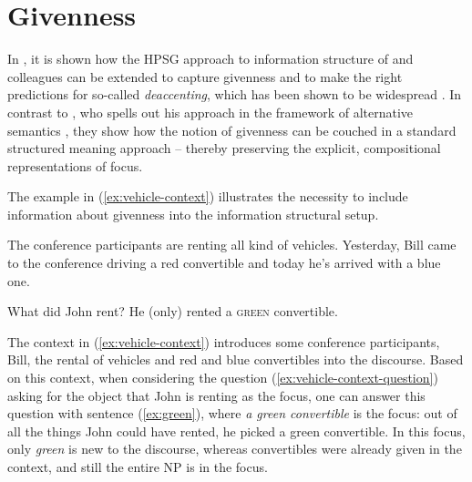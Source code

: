 \documentclass[output=paper
                ,modfonts
                ,nonflat
	        ,collection
	        ,collectionchapter
	        ,collectiontoclongg
 	        ,biblatex
                ,babelshorthands
                ,newtxmath
                ,draftmode
                ,colorlinks, citecolor=brown
]{./langsci/langscibook}
\begin{document}
\section{Givenness}
\label{sec:givenness}

In \cite{DeKuthy.Meurers-11}, it is shown how
the HPSG approach to information structure of \cite{deKuthy2002a} and
colleagues can be extended to capture givenness and to make the right
predictions for so-called \emph{deaccenting}, which has been shown to be
widespread \citep{buering:06}.  In contrast to
\cite{Schwarzschild99a-u}, who spells out his approach in the framework
of alternative semantics \citep{Rooth92a-u}, they show how the notion of
givenness can be couched in a standard structured meaning approach --
thereby preserving the explicit, compositional representations of focus.

The example in (\ref{ex:vehicle-context}) illustrates the necessity
to include information about givenness into the information structural
setup.

\begin{exe}
  \ex\label{ex:vehicle-context} The conference participants are
  renting all kind of vehicles.  Yesterday, Bill came to the
  conference driving a red convertible and today he's arrived with a
  blue one. \begin{xlist} \ex\label{ex:vehicle-context-question} What did John rent?
    \ex\label{ex:green} He (only) rented {\LF}a \textsc{green}
    convertible{\RF}.
  \end{xlist}
\end{exe}


The context in (\ref{ex:vehicle-context}) introduces some conference participants, Bill, the rental of
vehicles and red and blue convertibles into the discourse.  Based on
this context, when considering the question
(\ref{ex:vehicle-context-question}) asking for the object that John is
renting as the focus, one can  answer this question with sentence (\ref{ex:green}), where
\textit{a green convertible} is the focus: out of all the things John
could have rented, he picked a green convertible. In this focus, only
\textit{green} is new to the discourse, whereas convertibles were
already given in the context, and still the entire NP is in the focus.
\end{document}
